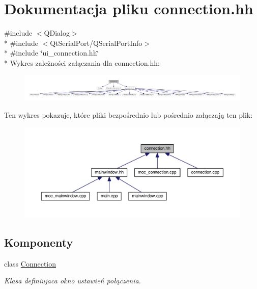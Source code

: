 \hypertarget{connection_8hh}{}\section{Dokumentacja pliku connection.\+hh}
\label{connection_8hh}
{\ttfamily \#include $<$Q\+Dialog$>$}\\*
{\ttfamily \#include $<$Qt\+Serial\+Port/\+Q\+Serial\+Port\+Info$>$}\\*
{\ttfamily \#include \char`\"{}ui\+\_\+connection.\+hh\char`\"{}}\\*
Wykres zależności załączania dla connection.\+hh\+:\nopagebreak
\begin{figure}[H]
\begin{center}
\leavevmode
\includegraphics[width=350pt]{connection_8hh__incl}
\end{center}
\end{figure}
Ten wykres pokazuje, które pliki bezpośrednio lub pośrednio załączają ten plik\+:\nopagebreak
\begin{figure}[H]
\begin{center}
\leavevmode
\includegraphics[width=350pt]{connection_8hh__dep__incl}
\end{center}
\end{figure}
\subsection*{Komponenty}
\begin{DoxyCompactItemize}
\item 
class \hyperlink{class_connection}{Connection}
\begin{DoxyCompactList}\small\item\em Klasa definiujaca okno ustawień połączenia. \end{DoxyCompactList}\end{DoxyCompactItemize}
